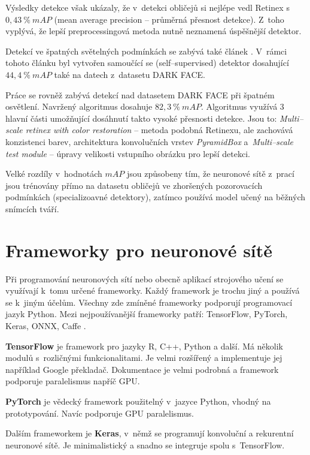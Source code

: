 Výsledky detekce však ukázaly, že v~detekci obličejů si nejlépe vedl Retinex s~$0,43\:\%\:mAP$ (mean average precision -- průměrná přesnost detekce). Z~toho vyplývá, že lepší preprocessingová metoda nutně neznamená úspěšnější detektor.

Detekcí ve špatných světelných podmínkách se zabývá také článek \cite{HLAFace}. V~rámci tohoto článku byl vytvořen samoučící se (self--supervised) detektor dosahující $44,4\:\%\:mAP$ také na datech z~datasetu DARK FACE.

Práce \cite{fdExtremelyLowConditions} se rovněž zabývá detekcí nad datasetem DARK FACE při špatném osvětlení. Navržený algoritmus dosahuje $82,3\:\%\:mAP$. Algoritmus využívá 3 hlavní části umožňující dosáhnutí takto vysoké přesnosti detekce. Jsou to: \emph{Multi--scale retinex with color restoration} -- metoda podobná Retinexu, ale zachovává konzistenci barev, architektura konvolučních vrstev \emph{PyramidBox} a~\emph{Multi--scale test module} -- úpravy velikosti vstupního obrázku pro lepší detekci.

Velké rozdíly v~hodnotách $mAP$ jsou způsobeny tím, že neuronové sítě z~prací \cite{HLAFace, fdExtremelyLowConditions} jsou trénovány přímo na datasetu obličejů ve zhoršených pozorovacích podmínkách (specializoavné detektory), zatímco \cite{lowLightFdReview} používá model učený na běžných snímcích tváří.

\section{Frameworky pro neuronové sítě}
\label{sekce:frameworky_pro_ns}
Při programování neuronových sítí nebo obecně aplikací strojového učení se využívají k~tomu určené frameworky. Každý framework je trochu jiný a používá se k~jiným účelům. Všechny zde zmíněné frameworky podporují programovací jazyk Python. Mezi nejpoužívanější frameworky patří: TensorFlow, PyTorch, Keras, ONNX, Caffe \cite{nsFrameworks}.

\vspace{1em}
\textbf{TensorFlow} je framework pro jazyky R, C++, Python a další. Má několik modulů s~rozličnými funkcionalitami. Je velmi rozšířený a implementuje jej například Google překladač. Dokumentace je velmi podrobná a framework podporuje paralelismus napříč GPU.

\textbf{PyTorch} je vědecký framework použitelný v~jazyce Python, vhodný na prototypování. Navíc podporuje GPU paralelismus.

Dalším frameworkem je \textbf{Keras}, v~němž se programují konvoluční a rekurentní neuronové sítě. Je minimalistický a snadno se integruje spolu s~TensorFlow.

